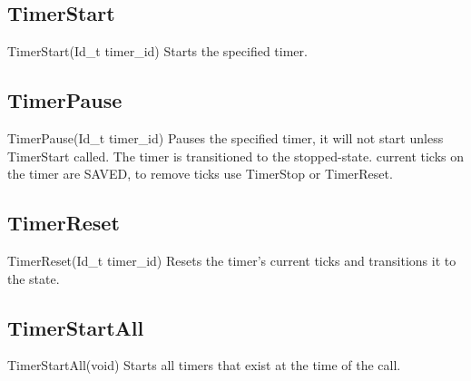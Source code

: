 \subsection{TimerStart}
\label{func:TimerStart}
\begin{pdfunction}
{TimerStart(Id\_t timer\_id) }
{ 
Starts the specified timer. }
\end{pdfunction}

\subsection{TimerPause}
\label{func:TimerPause}
\begin{pdfunction}
{TimerPause(Id\_t timer\_id) }
{ 
Pauses the specified timer, it will not start unless TimerStart 
called. The timer is transitioned to the stopped-state. 
current ticks on the timer are SAVED, to remove ticks use TimerStop or 
TimerReset.}
\end{pdfunction}

\subsection{TimerReset}
\label{func:TimerReset}
\begin{pdfunction}
{TimerReset(Id\_t timer\_id) }
{ 
Resets the timer's current ticks and transitions it to the 
state. }
\end{pdfunction}

\subsection{TimerStartAll}
\label{func:TimerStartAll}
\begin{pdfunction}
{TimerStartAll(void) }
{ 
Starts all timers that exist at the time of the call. }
\end{pdfunction}

